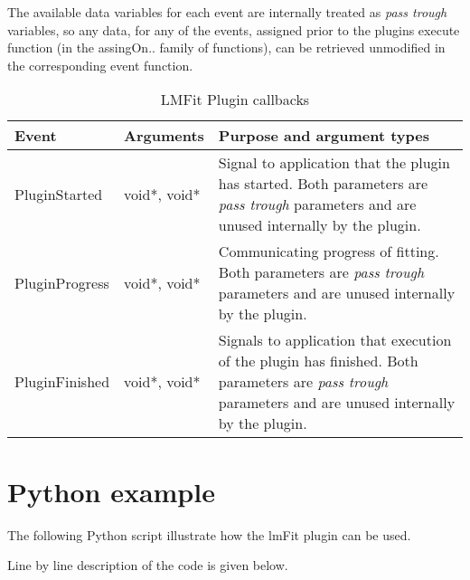 The available data variables for each event are internally treated as \emph{pass trough} variables, so any data, for any of the events, assigned prior to 
the plugins execute function (in the assingOn.. family of functions), can be retrieved unmodified in the corresponding event function.

\begin{table}[ht]
\centering %
\begin{tabular}{l l p{9cm}} 

Event & Arguments & Purpose and argument types \\ [0.5ex] %
\hline %
PluginStarted  	& 	void*, void*  & Signal to application that the plugin has started. Both parameters are \emph{pass trough} parameters and are unused internally by the plugin.\\[0.5ex]
PluginProgress	& 	void*, void*  & Communicating progress of fitting. Both parameters are \emph{pass trough} parameters and are unused internally by the plugin. \\[0.5ex]
PluginFinished	& 	void*, void*  & Signals to application that execution of the plugin has finished. Both parameters are \emph{pass trough} parameters and are unused internally by the plugin.\\

\hline %
\end{tabular}
\caption{LMFit Plugin callbacks} 
\label{table:lmfitPluginCallBacks} 
\end{table}

\section{Python example}
The following Python script illustrate how the lmFit plugin can be used. 

Line by line description of the code is given below.

\begin{singlespace}

\end{singlespace}

